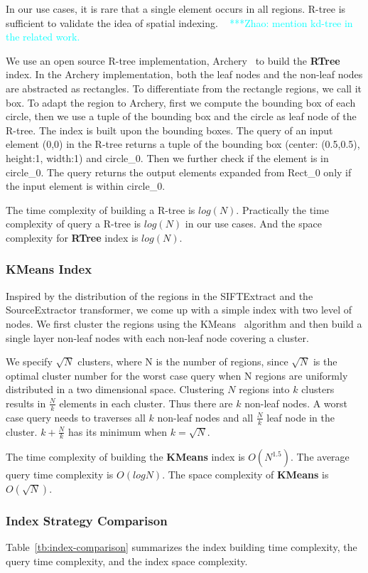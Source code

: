 \documentclass{sig-alternate}
\newcommand{\zhaonote}[1]{{\textcolor{cyan}    { ***Zhao:      #1 }}}
\newcommand{\zhaonote}[1]{}
\begin{document}
In our use cases, it is rare that a single element occurs in all regions. 
R-tree is sufficient to validate the idea of spatial indexing.
~\zhaonote{mention kd-tree in the related work.}

We use an open source R-tree implementation, Archery~\cite{osheim13} to build the {\bf RTree} index.
In the Archery implementation, both the leaf nodes and the non-leaf nodes are abstracted as rectangles.
To differentiate from the rectangle regions, we call it box.
To adapt the region to Archery, first we compute the bounding box of each circle, then we use
a tuple of the bounding box and the circle as leaf node of the R-tree. 
The index is built upon the bounding boxes. 
The query of an input element (0,0) in the R-tree returns a tuple of the bounding box (center: (0.5,0.5), height:1, width:1) and circle\_0.
Then we further check if the element is in circle\_0. 
The query returns the output elements expanded from Rect\_0 only if the input element is within circle\_0.

The time complexity of building a R-tree is $log(N)$.
Practically the time complexity of query a R-tree is $log(N)$ in our use cases.
And the space complexity for {\bf RTree} index is $log(N)$.

\subsubsection{KMeans Index}
Inspired by the distribution of the regions in the SIFTExtract and the SourceExtractor transformer,
we come up with a simple index with two level of nodes.
We first cluster the regions using the KMeans~\cite{macqueen67} algorithm 
and then build a single layer non-leaf nodes with each non-leaf node covering a cluster.

We specify $\sqrt{N}$ clusters, where N is the number of regions, 
since $\sqrt{N}$ is the optimal cluster number for the worst case query when N regions are uniformly distributed in a two dimensional space.
Clustering $N$ regions into $k$ clusters results in $\frac{N}{k}$ elements in each cluster. 
Thus there are $k$ non-leaf nodes.
A worst case query needs to traverses all $k$ non-leaf nodes and all $\frac{N}{k}$ leaf node in the cluster.
$k+\frac{N}{k}$ has its minimum when $k=\sqrt{N}$. 

The time complexity of building the {\bf KMeans} index is $O(N^{1.5})$.
The average query time complexity is $O(logN)$.
The space complexity of {\bf KMeans} is $O(\sqrt{N})$.

\subsubsection{Index Strategy Comparison}
Table~\ref{tb:index-comparison} summarizes the index building time complexity, 
the query time complexity, and the index space complexity.
\end{document}
